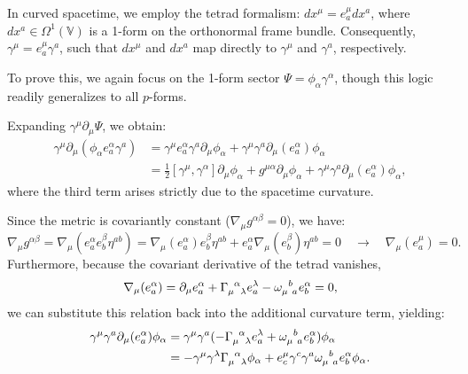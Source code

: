 In curved spacetime, we employ the tetrad formalism: 
$dx^\mu=e^\mu_a dx^a$, where $dx^a \in \Omega^1(\mathbb{V})$ is a 1-form on the orthonormal frame bundle. Consequently, $\gamma^\mu=e^\mu_a\gamma^a$, such that $dx^\mu$ and $dx^a$ map directly to $\gamma^\mu$ and $\gamma^a$, respectively.

To prove this, we again focus on the 1-form sector $\Psi=\phi_\alpha \gamma^\alpha$, though this logic readily generalizes to all $p$-forms. 

Expanding $\gamma^\mu \partial_\mu\Psi$, we obtain:
\begin{equation}\label{eq:gamma_mu_partial_mu_Psi}
\begin{aligned}
    \gamma^\mu \partial_\mu(\phi_\alpha e^\alpha_a\gamma^a)&=\gamma^\mu e^\alpha_a\gamma^a \partial_\mu\phi_\alpha + \gamma^\mu \gamma^a\partial_\mu( e^\alpha_a)\phi_\alpha\\
    &=\frac{1}{2}[\gamma^\mu,\gamma^\alpha]\partial_\mu\phi_\alpha+g^{\mu\alpha}\partial_\mu\phi_\alpha+\gamma^\mu \gamma^a\partial_\mu( e^\alpha_a)\phi_\alpha,
\end{aligned}
\end{equation}
where the third term arises strictly due to the spacetime curvature.

Since the metric is covariantly constant ($\nabla_\mu g^{\alpha\beta}=0$), we have:
\[ \nabla_\mu g^{\alpha\beta}= \nabla_\mu(e^\alpha_a e^\beta_b \eta^{ab})=\nabla_\mu (e^\alpha_a) e^\beta_b \eta^{ab}+e^\alpha_a \nabla_\mu(e^\beta_b) \eta^{ab}=0 \quad \to \quad \nabla_\mu(e^\mu_a)=0. \]
Furthermore, because the covariant derivative of the tetrad vanishes,
\begin{equation}
\begin{aligned}
    \nabla_\mu(e^\alpha_a) =\partial_\mu e^\alpha_a+\tensor{\Gamma}{_\mu^\alpha_\lambda}  e^\lambda_a-\tensor{\omega}{_\mu^b_a}e^\alpha_b=0,
\end{aligned}
\end{equation}
we can substitute this relation back into the additional curvature term, yielding: 
\begin{equation}
\begin{aligned}
    \gamma^\mu \gamma^a\partial_\mu( e^\alpha_a)\phi_\alpha &= \gamma^\mu\gamma^a (-\tensor{\Gamma}{_\mu^\alpha_\lambda}  e^\lambda_a+\tensor{\omega}{_\mu^b_a}e^\alpha_b)\phi_\alpha\\
    &= -\gamma^\mu\gamma^\lambda \tensor{\Gamma}{_\mu^\alpha_\lambda} \phi_\alpha+ e^\mu_c\gamma^c\gamma^a \tensor{\omega}{_\mu^b_a}e^\alpha_b\phi_\alpha.
\end{aligned}
\end{equation}

